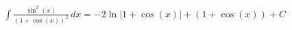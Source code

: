\documentclass[preview]{standalone}
\begin{document}
\begin{align*}
\int \frac{\sin^2(x)}{(1 + \cos(x))^2} \, dx = -2 \ln|1 + \cos(x)| + (1 + \cos(x)) + C
\end{align*}
\end{document}
